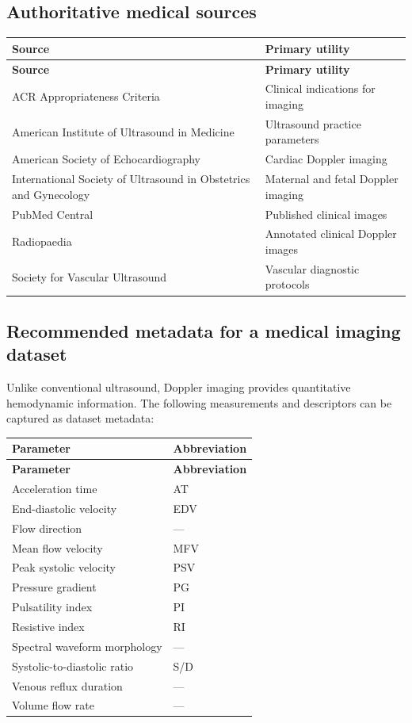 \subsection{Authoritative medical sources}
\begin{longtable}{@{}p{}p{}@{}}
\toprule
\textbf{Source} & \textbf{Primary utility} \\
\midrule
\endfirsthead
\toprule
\textbf{Source} & \textbf{Primary utility} \\
\midrule
\endhead
ACR Appropriateness Criteria & Clinical indications for imaging \\
American Institute of Ultrasound in Medicine & Ultrasound practice parameters \\
American Society of Echocardiography & Cardiac Doppler imaging \\
International Society of Ultrasound in Obstetrics and Gynecology & Maternal and fetal Doppler imaging \\
PubMed Central & Published clinical images \\
Radiopaedia & Annotated clinical Doppler images \\
Society for Vascular Ultrasound & Vascular diagnostic protocols \\
\bottomrule
\end{longtable}

\subsection{Recommended metadata for a medical imaging dataset}
Unlike conventional ultrasound, Doppler imaging provides quantitative hemodynamic information. The following measurements and descriptors can be captured as dataset metadata:

\begin{longtable}{@{}p{}p{}@{}}
\toprule
\textbf{Parameter} & \textbf{Abbreviation} \\
\midrule
\endfirsthead
\toprule
\textbf{Parameter} & \textbf{Abbreviation} \\
\midrule
\endhead
Acceleration time & AT \\
End-diastolic velocity & EDV \\
Flow direction & --- \\
Mean flow velocity & MFV \\
Peak systolic velocity & PSV \\
Pressure gradient & PG \\
Pulsatility index & PI \\
Resistive index & RI \\
Spectral waveform morphology & --- \\
Systolic-to-diastolic ratio & S/D \\
Venous reflux duration & --- \\
Volume flow rate & --- \\
\bottomrule
\end{longtable}

